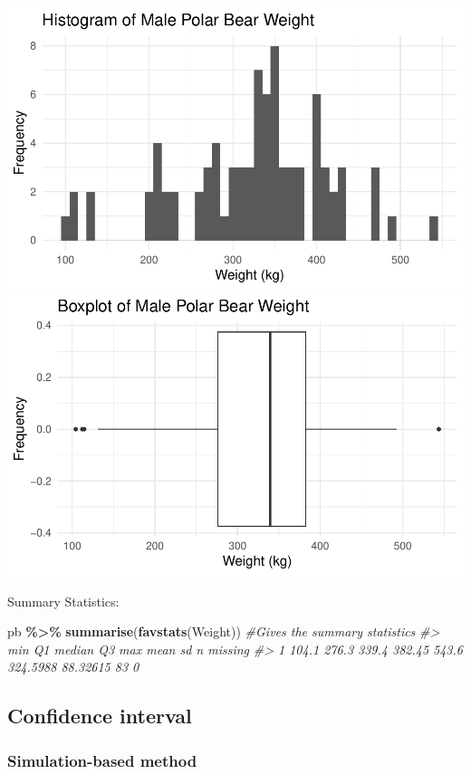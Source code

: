 \documentclass[
]{report}
\newenvironment{Shaded}{\begin{snugshade}}{\end{snugshade}}
\newcommand{\CommentTok}[1]{\textcolor[rgb]{0.56,0.35,0.01}{\textit{#1}}}
\newcommand{\FunctionTok}[1]{\textcolor[rgb]{0.13,0.29,0.53}{\textbf{#1}}}
\newcommand{\NormalTok}[1]{#1}
\newcommand{\SpecialCharTok}[1]{\textcolor[rgb]{0.81,0.36,0.00}{\textbf{#1}}}
\begin{document}
\begin{center}\includegraphics[width=0.6\linewidth]{07-VN07-one_meantheory_files/figure-latex/unnamed-chunk-2-1} \includegraphics[width=0.6\linewidth]{07-VN07-one_meantheory_files/figure-latex/unnamed-chunk-2-2} \end{center}

Summary Statistics:

\begin{Shaded}
\begin{Highlighting}[]
\NormalTok{pb }\SpecialCharTok{\%\textgreater{}\%}
  \FunctionTok{summarise}\NormalTok{(}\FunctionTok{favstats}\NormalTok{(Weight)) }\CommentTok{\#Gives the summary statistics}
\CommentTok{\#\textgreater{}     min    Q1 median     Q3   max     mean       sd  n missing}
\CommentTok{\#\textgreater{} 1 104.1 276.3  339.4 382.45 543.6 324.5988 88.32615 83       0}
\end{Highlighting}
\end{Shaded}

\subsection*{Confidence interval}\label{confidence-interval}

\subsubsection*{Simulation-based method}\label{simulation-based-method-1}
\end{document}
